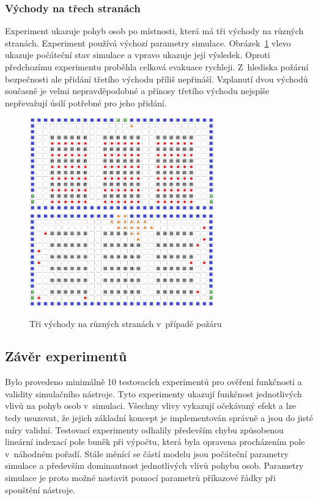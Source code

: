 \documentclass[11pt, titlepage, a4paper]{article}
\begin{document}
        \subsubsection{Východy na třech stranách}
        Experiment ukazuje pohyb osob po místnosti, která má tři východy na různých stranách. Experiment používá výchozí parametry simulace. Obrázek~\ref{overFire} vlevo ukazuje počáteční stav simulace a vpravo ukazuje její výsledek. Oproti předchozímu experimentu proběhla celková evakuace rychleji. Z~hlediska požární bezpečnosti ale přidání třetího východu příliš nepřináší. Vzplanutí dvou východů současně je velmi nepravděpodobné a přínosy třetího východu nejspíše nepřevažují úsilí potřebné pro jeho přidání.\\

        \begin{figure}[H]
            \includegraphics[width=8cm]{FireResearch/overFireInit}
            \includegraphics[width=8cm]{FireResearch/overFireEnd}
            \caption{Tři východy na různých stranách v~případě požáru}
            \label{overFire}
        \end{figure}

    \subsection{Závěr experimentů}
    Bylo provedeno minimálně 10 testovacích experimentů pro ověření funkčnosti a validity simulačního nástroje. Tyto experimenty ukazují funkčnost jednotlivých vlivů na pohyb osob v~simulaci. Všechny vlivy vykazují očekávaný efekt a lze tedy usuzovat, že jejich základní koncept je implementován správně a jsou do jisté míry validní. Testovací experimenty odhalily především chybu způsobenou lineární indexací pole buněk při výpočtu, která byla opravena procházením pole v~náhodném pořadí. Stále měnící se částí modelu jsou počáteční parametry simulace a především dominantnost jednotlivých vlivů pohybu osob. Parametry simulace je proto možné nastavit pomocí parametrů příkazové řádky při spouštění nástroje.
\end{document}
